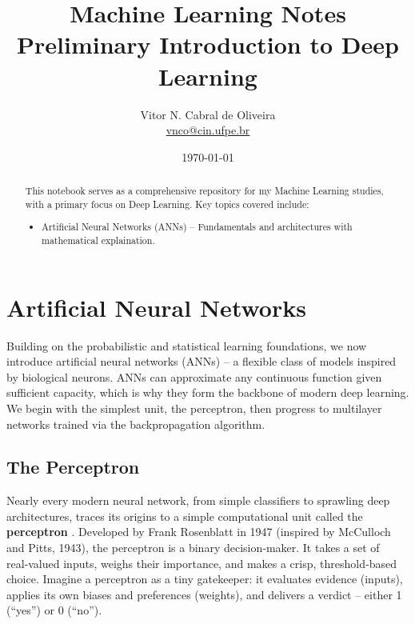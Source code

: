 \documentclass{tufte-handout}
\title{Machine Learning Notes \\ Preliminary Introduction to Deep Learning}
\author{Vitor N. Cabral de Oliveira\\ \href{mailto:vnco@cin.ufpe.br}{vnco@cin.ufpe.br}}
\date{\today}
\begin{document}
\maketitle
\begin{abstract}
    This notebook serves as a comprehensive repository for my Machine Learning studies, with a primary focus on Deep Learning. Key topics covered include:
    \begin{itemize}
        \item Artificial Neural Networks (ANNs) – Fundamentals and architectures with mathematical explaination.
    \end{itemize}
\end{abstract}

\newpage
\hypersetup{linkcolor=wp-text}
\tableofcontents
\hypersetup{linkcolor=wp-primary}
\newpage

\section{Artificial Neural Networks}

Building on the probabilistic and statistical learning foundations, we now introduce artificial neural networks (ANNs) – a flexible class of models inspired by biological neurons. ANNs can approximate any continuous function given sufficient capacity, which is why they form the backbone of modern deep learning. We begin with the simplest unit, the perceptron, then progress to multilayer networks trained via the backpropagation algorithm.

\subsection{The Perceptron}

Nearly every modern neural network, from simple classifiers to sprawling deep architectures, traces its origins to a simple computational unit called the \textbf{perceptron} . Developed by Frank Rosenblatt in 1947 (inspired by McCulloch and Pitts, 1943), the perceptron is a binary decision‑maker. It takes a set of real‑valued inputs, weighs their importance, and makes a crisp, threshold‑based choice. Imagine a perceptron as a tiny gatekeeper: it evaluates evidence (inputs), applies its own biases and preferences (weights), and delivers a verdict – either 1 (“yes”) or 0 (“no”).
\end{document}
